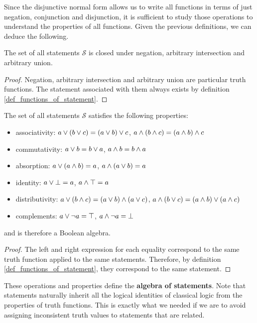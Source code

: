 \documentclass[11pt,letterpaper,fleqn]{memoir} %
\begin{document}
Since the disjunctive normal form allows us to write all functions in terms of just negation, conjunction and disjunction, it is sufficient to study those operations to understand the properties of all functions. Given the previous definitions, we can deduce the following.

\begin{mathSection}
	\begin{prop}
		The set of all statements $\mathcal{S}$ is closed under negation, arbitrary intersection and arbitrary union.
	\end{prop}
	\begin{proof}
		Negation, arbitrary intersection and arbitrary union are particular truth functions. The statement associated with them always exists by definition  \eqref{def_functions_of_statement}.
	\end{proof}
	\begin{prop}\label{boolean_properties}
		The set of all statements $\mathcal{S}$ satisfies the following properties:
		\begin{itemize}
			\item associativity: $a \vee (b \vee c) = (a \vee b) \vee c$, $a \wedge (b \wedge c) = (a \wedge b) \wedge c$
			\item commutativity: $a \vee b = b \vee a$, $a \wedge b = b \wedge a$
			\item absorption: $a \vee (a \wedge b) = a$, $a \wedge (a \vee b) = a$
			\item identity: $a \vee \bot = a
			$, $a \wedge \top = a$
			\item distributivity: $a \vee (b \wedge c) = (a \vee b) \wedge (a \vee c)$, $a \wedge (b \vee c) = (a \wedge b) \vee (a \wedge c)$
			\item complements: $a \vee \neg a = \top$, $a \wedge \neg a = \bot$
		\end{itemize}
		and is therefore a Boolean algebra.
	\end{prop}
	\begin{proof}
		The left and right expression for each equality correspond to the same truth function applied to the same statements. Therefore, by definition  \eqref{def_functions_of_statement}, they correspond to the same statement.
	\end{proof}
\end{mathSection}

These operations and properties define the \textbf{algebra of statements}. Note that statements naturally inherit all the logical identities of classical logic from the properties of truth functions. This is exactly what we needed if we are to avoid assigning inconsistent truth values to statements that are related. 
\end{document}
